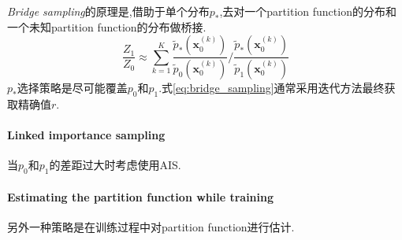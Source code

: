 \textit{Bridge sampling}的原理是,借助于单个分布$p_\ast$,去对一个partition function的分布和一个未知partition function的分布做桥接.
\begin{equation}\label{eq:bridge_sampling}
\frac{Z_1}{Z_0}\approx\sum_{k=1}^K\frac{\tilde p_\ast(\mathbf x_0^{(k)})}{\tilde p_0(\mathbf x_0^{(k)})}\Big/\frac{\tilde p_\ast(\mathbf x_0^{(k)})}{\tilde p_1(\mathbf x_0^{(k)})}
\end{equation}
$p_\ast$选择策略是尽可能覆盖$p_0$和$p_1$.式\ref{eq:bridge_sampling}通常采用迭代方法最终获取精确值$r$.

\paragraph{Linked importance sampling}当$p_0$和$p_1$的差距过大时考虑使用AIS.

\paragraph{Estimating the partition function while training}另外一种策略是在训练过程中对partition function进行估计.